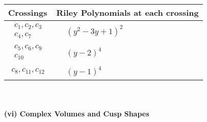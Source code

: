 \documentclass[1p]{elsarticle_modified}
\theoremstyle{definition}
\begin{document}
\begin{tabular}{m{50pt}|m{274pt}}
Crossings & \hspace{64pt}Riley Polynomials at each crossing \\
\hline $$\begin{aligned}c_{1},c_{2},c_{3}\\c_{4},c_{7}\end{aligned}$$&$\begin{aligned}
&(y^2-3 y+1)^2
\end{aligned}$\\
\hline $$\begin{aligned}c_{5},c_{6},c_{9}\\c_{10}\end{aligned}$$&$\begin{aligned}
&(y-2)^4
\end{aligned}$\\
\hline $$\begin{aligned}c_{8},c_{11},c_{12}\end{aligned}$$&$\begin{aligned}
&(y-1)^4
\end{aligned}$\\
\hline
\end{tabular}\\~\\
\newpage\flushleft \textbf{(vi) Complex Volumes and Cusp Shapes}
\end{document}
